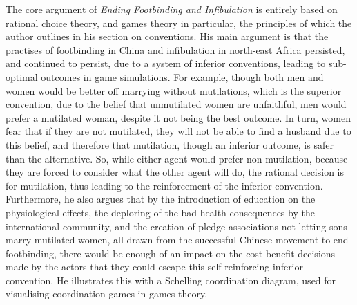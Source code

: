 \documentclass[twoside, 11pt]{article}
\begin{document}
	The core argument of \textit{Ending Footbinding and Infibulation} is entirely based on rational choice theory, and games theory in particular, the principles of which the author outlines in his section on conventions. \cite[pp.1005-1007]{Mackie1996} His main argument is that the practises of footbinding in China and infibulation in north-east Africa persisted, and continued to persist, due to a system of inferior conventions, leading to sub-optimal outcomes in game simulations. For example, though both men and women would be better off marrying without mutilations, which is the superior convention, due to the belief that unmutilated women are unfaithful, men would prefer a mutilated woman, despite it not being the best outcome. In turn, women fear that if they are not mutilated, they will not be able to find a husband due to this belief, and therefore that mutilation, though an inferior outcome, is safer than the alternative. \cite[p.1008]{Mackie1996} So, while either agent would prefer non-mutilation, because they are forced to consider what the other agent will do, the rational decision is for mutilation, thus leading to the reinforcement of the inferior convention. Furthermore, he also argues that by the introduction of education on the physiological effects, the deploring of the bad health consequences by the international community, and the creation of pledge associations not letting sons marry mutilated women, all drawn from the successful Chinese movement to end footbinding, there would be enough of an impact on the cost-benefit decisions made by the actors that they could escape this self-reinforcing inferior convention. \cite[p.1012]{Mackie1996} He illustrates this with a Schelling coordination diagram, used for visualising coordination games in games theory.
\end{document}
